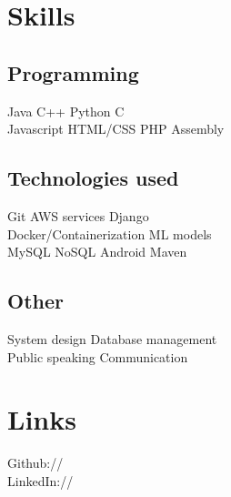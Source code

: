 \documentclass[]{resume_openfont}
\begin{document}
\begin{minipage}[t]{0.33\textwidth}

\section{Skills}
\subsection{Programming}
Java \textbullet{}   C++ \textbullet{} Python \textbullet{} C\\
Javascript \textbullet{} HTML/CSS \textbullet{} PHP \textbullet{} Assembly \\
\sectionsep

\subsection{Technologies used}
Git \textbullet{} AWS services \textbullet{} Django \\
Docker/Containerization \textbullet{} ML models \\
MySQL \textbullet{} NoSQL \textbullet{} Android \textbullet{} Maven \\
\sectionsep

\subsection{Other}
System design \textbullet{} Database management \\
Public speaking \textbullet{} Communication\\
\sectionsep


\section{Links} 
Github:// \href{https://github.com/thenamanpat}{} \\
LinkedIn://  \href{https://www.linkedin.com/in/thenamanpat}{} \\
\sectionsep

%
%

\end{minipage} 
\hfill
\end{document}
